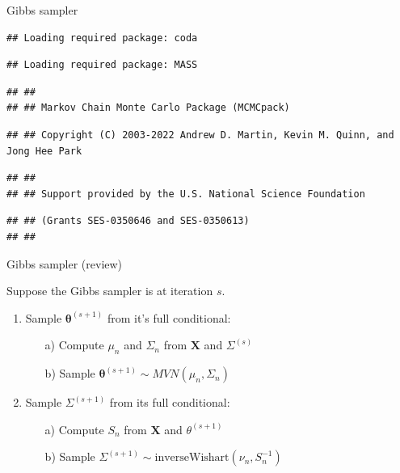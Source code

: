 \documentclass[
  ignorenonframetext,
]{beamer}
\newcommand{\btheta}{{\bm\theta}}
\newcommand{\bX}   {\bm{X}}
\begin{document}
\begin{frame}[fragile]{Gibbs sampler}
\protect\hypertarget{gibbs-sampler-1}{}

\begin{verbatim}
## Loading required package: coda
\end{verbatim}

\begin{verbatim}
## Loading required package: MASS
\end{verbatim}

\begin{verbatim}
## ##
## ## Markov Chain Monte Carlo Package (MCMCpack)
\end{verbatim}

\begin{verbatim}
## ## Copyright (C) 2003-2022 Andrew D. Martin, Kevin M. Quinn, and Jong Hee Park
\end{verbatim}

\begin{verbatim}
## ##
## ## Support provided by the U.S. National Science Foundation
\end{verbatim}

\begin{verbatim}
## ## (Grants SES-0350646 and SES-0350613)
## ##
\end{verbatim}

\end{frame}

\begin{frame}{Gibbs sampler (review)}
\protect\hypertarget{gibbs-sampler-review}{}

Suppose the Gibbs sampler is at iteration \(s.\)

\begin{enumerate}
\item Sample $\btheta^{(s+1)}$ from it's full conditional:
\begin{enumerate}
\item[a)] Compute $\mu_n$ and $\Sigma_n$ from $\bX$ and $\Sigma^{(s)}$
\item[b)] Sample $\btheta^{(s+1)}\sim MVN(\mu_n, \Sigma_n)$
\end{enumerate}
\item Sample $\Sigma^{(s+1)}$ from its full conditional:
\begin{enumerate}
\item[a)] Compute $S_n$ from $\bX$ and $\theta^{(s+1)}$
\item[b)] Sample $\Sigma^{(s+1)} \sim \text{inverseWishart}(\nu_n, S_n^{-1})$
\end{enumerate}
\end{enumerate}

\end{frame}
\end{document}
